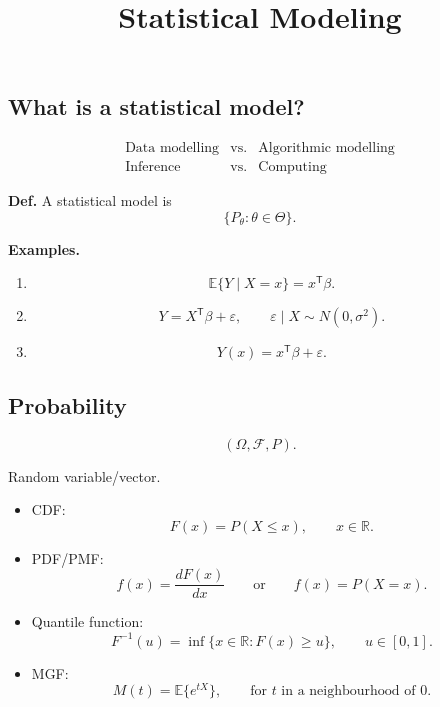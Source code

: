 \documentclass[11pt,a4paper]{article}
\title{Statistical Modeling}
\begin{document}
\maketitle
\thispagestyle{empty}
\subsection*{What is a statistical model?}

\[
\begin{array}{ccc}
\text{Data modelling} & \text{vs.} & \text{Algorithmic modelling} \\
\text{Inference} & \text{vs.} & \text{Computing}
\end{array}
\]

\noindent\textbf{Def.}
A statistical model is
\[
\{P_\theta:\theta\in\Theta\}.
\]

\noindent\textbf{Examples.}
\begin{enumerate}
    \item
    \[
    \mathbb{E}\{Y\mid X=x\}=x^{\mathsf T}\beta.
    \]

    \item
    \[
    Y=X^{\mathsf T}\beta+\varepsilon,
    \qquad
    \varepsilon\mid X\sim N(0,\sigma^2).
    \]

    \item
    \[
    Y(x)=x^{\mathsf T}\beta+\varepsilon.
    \]
\end{enumerate}

\subsection*{Probability}

\[
(\Omega,\mathcal{F},P).
\]

Random variable/vector.

\begin{itemize}
    \item CDF:
    \[
    F(x)=P(X\leq x),
    \qquad x\in\mathbb{R}.
    \]

    \item PDF/PMF:
    \[
    f(x)=\frac{dF(x)}{dx}
    \qquad\text{or}\qquad
    f(x)=P(X=x).
    \]

    \item Quantile function:
    \[
    F^{-1}(u)
    =
    \inf\{x\in\mathbb{R}:F(x)\geq u\},
    \qquad u\in[0,1].
    \]

    \item MGF:
    \[
    M(t)=\mathbb{E}\{e^{tX}\},
    \qquad
    \text{for }t\text{ in a neighbourhood of }0.
    \]
\end{itemize}
\end{document}
